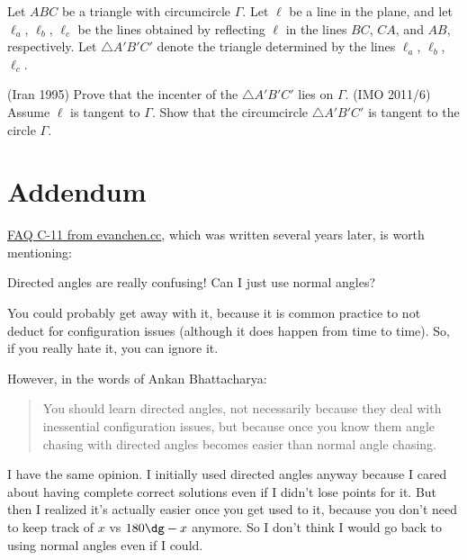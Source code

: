\documentclass[11pt]{scrartcl}
\begin{document}
\begin{problem}
  Let $ABC$ be a triangle with circumcircle $\Gamma$.
  Let $\ell$ be a line in the plane, and let $\ell_a$, $\ell_b$, $\ell_c$ be the lines obtained
  by reflecting $\ell$ in the lines $BC$, $CA$, and $AB$, respectively.
  Let $\triangle A'B'C'$ denote the triangle determined by the lines $\ell_a$, $\ell_b$, $\ell_c$.
  \begin{enumerate}[(a)]
    \ii (Iran 1995) Prove that the incenter of the $\triangle A'B'C'$ lies on $\Gamma$.
    \ii (IMO 2011/6) Assume $\ell$ is tangent to $\Gamma$.
    Show that the circumcircle $\triangle A'B'C'$ is tangent to the circle $\Gamma$.
  \end{enumerate}
\end{problem}

\newpage
\appendix
\section{Addendum}
\href{https://web.evanchen.cc/faq-contest.html#C-11}{FAQ C-11 from evanchen.cc},
which was written several years later, is worth mentioning:

\begin{ques*}
Directed angles are really confusing! Can I just use normal angles?
\end{ques*}

\begin{answer*}
You could probably get away with it,
because it is common practice to not deduct for configuration issues
(although it does happen from time to time).
So, if you really hate it, you can ignore it.

However, in the words of Ankan Bhattacharya:
\begin{quote}
You should learn directed angles,
not necessarily because they deal with inessential configuration issues,
but because once you know them angle chasing with directed angles
becomes easier than normal angle chasing.
\end{quote}

I have the same opinion.
I initially used directed angles anyway because I cared about having
complete correct solutions even if I didn't lose points for it.
But then I realized it's actually easier once you get used to it,
because you don't need to keep track of $x$ vs $180\dg-x$ anymore.
So I don't think I would go back to using normal angles even if I could.
\end{answer*}
\end{document}
